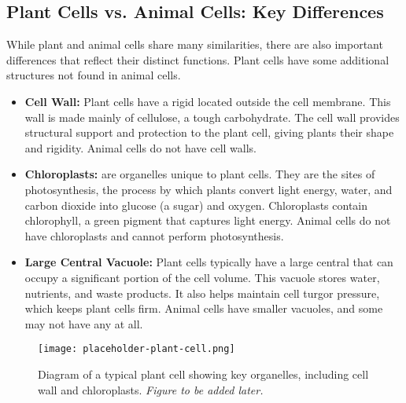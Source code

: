 \subsection{Plant Cells vs. Animal Cells: Key Differences}

While plant and animal cells share many similarities, there are also important differences that reflect their distinct functions.  Plant cells have some additional structures not found in animal cells.

\begin{itemize}
    \item \textbf{Cell Wall:}  Plant cells have a rigid  located outside the cell membrane. This wall is made mainly of cellulose, a tough carbohydrate. The cell wall provides structural support and protection to the plant cell, giving plants their shape and rigidity. Animal cells do not have cell walls. 

    \item \textbf{Chloroplasts:}   are organelles unique to plant cells. They are the sites of photosynthesis, the process by which plants convert light energy, water, and carbon dioxide into glucose (a sugar) and oxygen. Chloroplasts contain chlorophyll, a green pigment that captures light energy. Animal cells do not have chloroplasts and cannot perform photosynthesis. 

    \item \textbf{Large Central Vacuole:} Plant cells typically have a large central  that can occupy a significant portion of the cell volume. This vacuole stores water, nutrients, and waste products. It also helps maintain cell turgor pressure, which keeps plant cells firm. Animal cells have smaller vacuoles, and some may not have any at all. 
\end{itemize}

\begin{figure}[htb]
    \centering
    \texttt{[image: placeholder-plant-cell.png]}
    \caption{Diagram of a typical plant cell showing key organelles, including cell wall and chloroplasts. \textit{Figure to be added later.}}
    \label{fig:plant-cell}
\end{figure}

